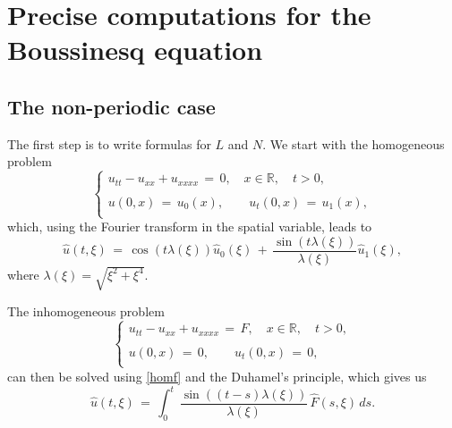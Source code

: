 \documentclass{amsart}
\begin{document}
\section{Precise computations for the Boussinesq equation}

\subsection{The non-periodic case} The first step is to write formulas for $L$ and $N$. We start with the homogeneous problem
\begin{equation}
\left\{
\begin{array}{l}
u_{tt}-u_{xx}+u_{xxxx}\,=\,0, \quad x\in\mathbb{R}, \quad t>0,\\
\\
u(0,x)\,=\,u_0(x),\qquad u_t(0,x)\,=\,u_1(x),\\
\end{array}\right.
\label{hom}
\end{equation}
which, using the Fourier transform in the spatial variable, leads to
\begin{equation}
\hat{u}(t,\xi)\,=\,\cos(t \lambda(\xi)) \hat{u}_0(\xi)\,+\,\frac{\sin(t \lambda(\xi))}{\lambda(\xi)} \hat{u}_1(\xi),
\label{homf}\end{equation}
where $\lambda(\xi)=\sqrt{\xi^2+\xi^4}$.

The inhomogeneous problem 
\begin{equation}
\left\{
\begin{array}{l}
u_{tt}-u_{xx}+u_{xxxx}\,=\,F, \quad x\in\mathbb{R}, \quad t>0,\\
\\
u(0,x)\,=\,0,\qquad u_t(0,x)\,=\,0,\\
\end{array}\right.
\label{ih}
\end{equation}
can then be solved using \eqref{homf} and the Duhamel's principle, which gives us
\begin{equation}
\hat{u}(t,\xi)\,=\,\int_0^t\,\frac{\sin((t-s) \lambda(\xi))}{\lambda(\xi)} \,\hat{F}(s,\xi)\,ds.
\label{ihf}
\end{equation}
\end{document}
